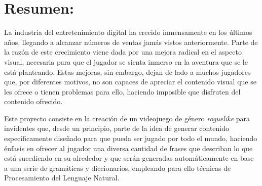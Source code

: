 \section*{Resumen:}

La industria del entretenimiento digital ha crecido inmensamente en los últimos años, llegando a alcanzar números de ventas jamás vistos anteriormente.
Parte de la razón de este crecimiento viene dada por una mejora radical en el aspecto visual, necesaria para que el jugador se sienta inmerso en la aventura que se le está planteando.
Estas mejoras, sin embargo, dejan de lado a muchos jugadores que, por diferentes motivos, no son capaces de apreciar el contenido visual que se les ofrece o tienen problemas para ello, haciendo imposible que disfruten del contenido ofrecido.

Este proyecto consiste en la creación de un videojuego de género \textit{roguelike} para invidentes que, desde un principio, parte de la idea de generar contenido específicamente diseñado para que pueda ser jugado por todo el mundo, haciendo énfasis en ofrecer al jugador una diversa cantidad de frases que describan lo que está sucediendo en su alrededor y que serán generadas automáticamente en base a una serie de gramáticas y diccionarios, empleando para ello técnicas de Procesamiento del Lenguaje Natural.

